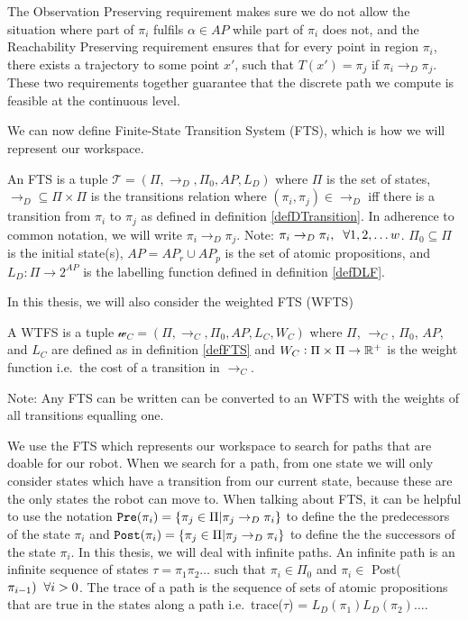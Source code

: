 The Observation Preserving requirement makes sure we do not allow the situation where part of $\pi_i$ fulfils $\alpha \in AP$ while part of $\pi_i$ does not, and the Reachability Preserving requirement ensures that for every point in region $\pi_i$, there exists a trajectory to some point $x'$, such that $T(x') = \pi_j$ if $\pi_i \rightarrow_D \pi_j$. These two requirements together guarantee that the discrete path we compute is feasible at the continuous level.


We can now define Finite-State Transition System (FTS), which is how we will represent our workspace.
\theoremstyle{definition}
\begin{definition}
\label{defFTS}
An FTS is a tuple $\mathcal{T} = (\Pi, \rightarrow_D, \Pi_0, AP,L_D)$ where $\Pi$ is the set of states, $\rightarrow_D \subseteq \Pi \times \Pi$ is the transitions relation where $(\pi_i,\pi_j) \in \rightarrow_D$ iff there is a transition from $\pi_i$ to $\pi_j$ as defined in definition \ref{defDTransition}. In adherence to common notation, we will write $\pi_i \rightarrow_D \pi_j$. Note: $\pi_i \rightarrow_D \pi_i, \hspace{0.2cm} \forall 1,2,\dots w$. $\Pi_0 \subseteq \Pi$ is the initial state(s), $AP=AP_r \cup AP_p$ is the set of atomic propositions, and $L_D: \Pi \rightarrow 2^{AP}$ is the labelling function defined in definition \ref{defDLF}.
\end{definition}

In this thesis, we will also consider the weighted FTS (WFTS)
\begin{definition}
\label{defWFTS}
A WTFS is a tuple $\mathcal{w}_C = (\Pi, \rightarrow_C, \Pi_0, AP,L_C,W_C)$ where $\Pi$, $\rightarrow_C$, $\Pi_0$, $AP$, and $L_C$ are defined as in definition \ref{defFTS} and $W_C: \Pi \times \Pi \rightarrow \mathbb{R}^+$ is the weight function i.e.\ the cost of a transition in $\rightarrow_C$. 
\end{definition}
Note: Any FTS can be written can be converted to an WFTS with the weights of all transitions equalling one.

We use the FTS which represents our workspace to search for paths that are doable for our robot. When we search for a path, from one state we will only consider states which have a transition from our current state, because these are the only states the robot can move to. When talking about FTS, it can be helpful to use the notation $\texttt{Pre}(\pi_i) = \{\pi_j \in \Pi | \pi_j \rightarrow_D \pi_i\}$ to define the the predecessors of the state $\pi_i$ and $\texttt{Post}(\pi_i) = \{\pi_j \in \Pi | \pi_j \rightarrow_D \pi_i\}$ to define the the successors of the state $\pi_i$. In this thesis, we will deal with infinite paths. An infinite path is an infinite sequence of states $\tau = \pi_1 \pi_2 \dots$ such that $\pi_i \in \Pi_0$ and $\pi_i \in $ Post($\pi_{i-1}) \hspace{0.2cm} \forall i > 0$. The trace of a path is the sequence of sets of atomic propositions that are true in the states along a path i.e.\ trace($\tau$) = $L_D(\pi_1)L_D(\pi_2) \dots$.  


